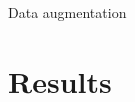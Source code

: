 \documentclass[10pt,svgnames]{beamer}
\begin{document}
\begin{frame}{Data augmentation}{}
{\begin{center}
\begin{figure}[htbp]
    	\label{figrsexample1}
	\end{figure}
  \end{center}
  }

\end{frame}
\section{Results}
\end{document}
